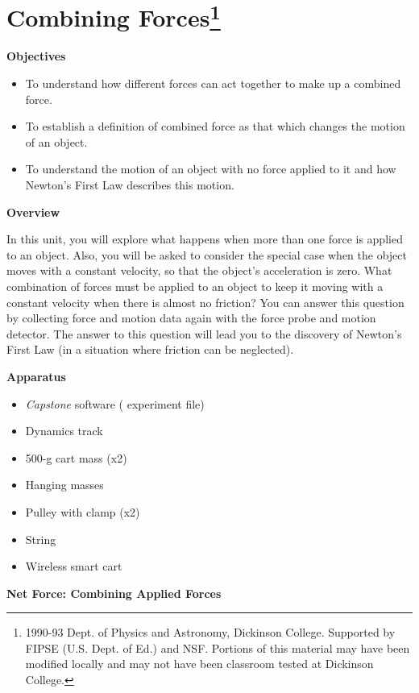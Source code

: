 
\section{Combining Forces\footnote{
1990-93 Dept. of Physics and Astronomy, Dickinson College. Supported by FIPSE
(U.S. Dept. of Ed.) and NSF. Portions of this material may have been modified
locally and may not have been classroom tested at Dickinson College.
}}

\makelabheader %

\textbf{Objectives}

\begin{itemize}
\item To understand how different forces can act together to make up a combined force.~ 
\item To establish a definition of combined force as that which changes the motion
of an object.
\item To understand the motion of an object with no force applied to it and how Newton's
First Law describes this motion.
\end{itemize}
\textbf{Overview}

In this unit, you will explore what happens when more than one force is applied
to an object. Also, you will be asked to consider the special case when the
object moves with a constant velocity, so that the object's acceleration is
zero. What combination of forces must be applied to an object to keep it moving
with a constant velocity when there is almost no friction? You can answer this
question by collecting force and motion data again with the force probe and
motion detector. The answer to this question will lead you to the discovery
of Newton's First Law (in a situation where friction can be neglected).

\textbf{Apparatus}

\begin{itemize}
\item \textit{Capstone} software ( experiment file)
\item Dynamics track
\item 500-g cart mass (x2)
\item Hanging masses
\item Pulley with clamp (x2)
\item String
\item Wireless smart cart
\end{itemize}
\textbf{Net Force: Combining Applied Forces }

